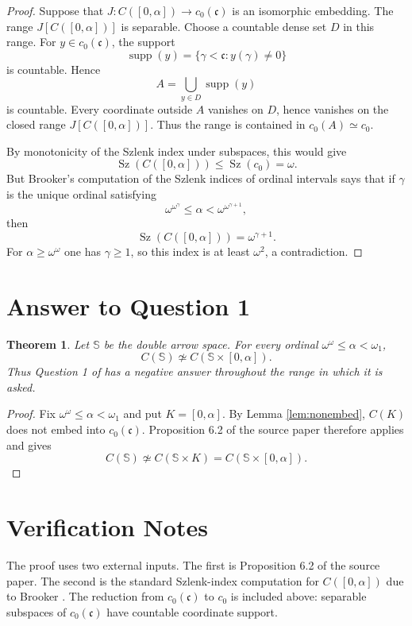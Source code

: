 \documentclass[11pt]{article}
\newtheorem{theorem}{Theorem}
\newcommand{\cS}{\mathbb S}
\newcommand{\ccard}{\mathfrak c}
\newcommand{\iso}{\simeq}
\newcommand{\notiso}{\not\simeq}
\newcommand{\Sz}{\operatorname{Sz}}
\begin{document}
\begin{proof}
Suppose that $J:C([0,\alpha])\to c_0(\ccard)$ is an isomorphic embedding.
The range $J[C([0,\alpha])]$ is separable. Choose a countable dense set
$D$ in this range. For $y\in c_0(\ccard)$, the support
\[
  \operatorname{supp}(y)=\{\gamma<\ccard:y(\gamma)\neq 0\}
\]
is countable. Hence
\[
  A=\bigcup_{y\in D}\operatorname{supp}(y)
\]
is countable. Every coordinate outside $A$ vanishes on $D$, hence vanishes on
the closed range $J[C([0,\alpha])]$. Thus the range is contained in
$c_0(A)\iso c_0$.

By monotonicity of the Szlenk index under subspaces, this would give
\[
  \Sz(C([0,\alpha]))\leq \Sz(c_0)=\omega.
\]
But Brooker's computation of the Szlenk indices of ordinal intervals says that
if $\gamma$ is the unique ordinal satisfying
\[
  \omega^{\omega^\gamma}\leq\alpha<\omega^{\omega^{\gamma+1}},
\]
then
\[
  \Sz(C([0,\alpha]))=\omega^{\gamma+1}.
\]
For $\alpha\geq\omega^\omega$ one has $\gamma\geq 1$, so this index is at
least $\omega^2$, a contradiction.
\end{proof}

\section{Answer to Question 1}

\begin{theorem}
Let $\cS$ be the double arrow space. For every ordinal
$\omega^\omega\leq\alpha<\omega_1$,
\[
  C(\cS)\notiso C(\cS\times[0,\alpha]).
\]
Thus Question 1 of \cite{Korpalski} has a negative answer throughout the
range in which it is asked.
\end{theorem}

\begin{proof}
Fix $\omega^\omega\leq\alpha<\omega_1$ and put $K=[0,\alpha]$.
By Lemma \ref{lem:nonembed}, $C(K)$ does not embed into $c_0(\ccard)$.
Proposition 6.2 of the source paper therefore applies and gives
\[
  C(\cS)\notiso C(\cS\times K)
  =
  C(\cS\times[0,\alpha]).
\]
\end{proof}

\section{Verification Notes}

The proof uses two external inputs. The first is Proposition 6.2 of the source
paper. The second is the standard Szlenk-index computation for
$C([0,\alpha])$ due to Brooker \cite{Brooker}. The reduction from
$c_0(\ccard)$ to $c_0$ is included above: separable subspaces of
$c_0(\ccard)$ have countable coordinate support.
\end{document}

